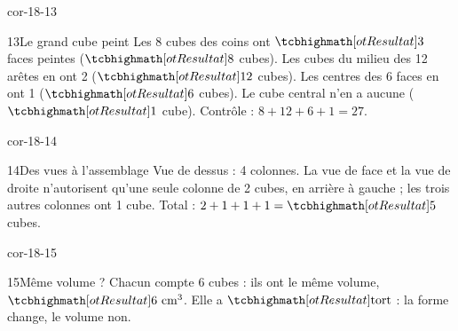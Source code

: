\begin{blocLivre}{cor-18-13}\begin{corrige}{13}{Le grand cube peint}
Les 8 cubes des coins ont $\res3$ faces peintes ($\res8$ cubes). Les cubes du milieu des 12 arêtes en ont 2 ($\res{12}$ cubes). Les centres des 6 faces en ont 1 ($\res6$ cubes). Le cube central n’en a aucune ($\res1$ cube). Contrôle : $8+12+6+1=27$.
\label{fig-cor-18-13}
\end{corrige}\end{blocLivre}
\begin{blocLivre}{cor-18-14}\begin{corrige}{14}{Des vues à l’assemblage}
Vue de dessus : 4 colonnes. La vue de face et la vue de droite n’autorisent qu’une seule colonne de 2 cubes, en arrière à gauche ; les trois autres colonnes ont 1 cube. Total : $2+1+1+1=\res5$ cubes.
\label{fig-cor-18-14}
\end{corrige}\end{blocLivre}
\begin{blocLivre}{cor-18-15}\begin{corrige}{15}{Même volume ?}
Chacun compte 6 cubes : ils ont le même volume, $\res{6\ \mathrm{cm}^3}$. Elle a $\res{\text{tort}}$ : la forme change, le volume non.
\label{fig-cor-18-15}
\end{corrige}\end{blocLivre}
